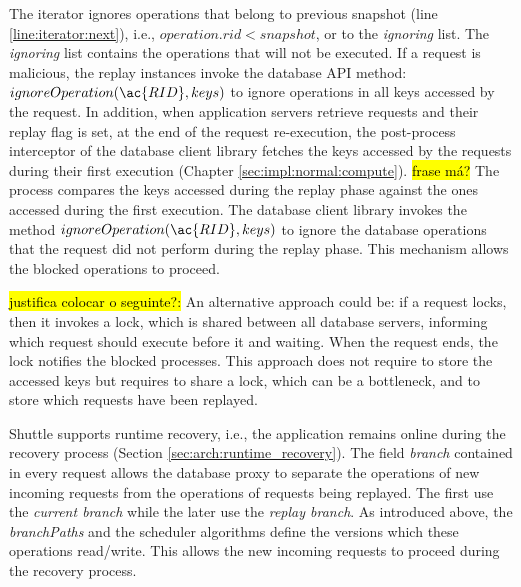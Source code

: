 The iterator ignores operations that belong to previous snapshot (line \ref{line:iterator:next}), i.e., $operation.rid < snapshot$, or to the \emph{ignoring} list. The \emph{ignoring} list contains the operations that will not be executed. If a request is malicious, the replay instances invoke the database \ac{API} method: $ignoreOperation(\ac{RID},keys)$ to ignore operations in all keys accessed by the request. In addition, when application servers retrieve requests and their replay flag is set, at the end of the request re-execution, the post-process interceptor of the database client library fetches the keys accessed by the requests during their first execution (Chapter \ref{sec:impl:normal:compute}). \hl{frase má?} The process compares the keys accessed during the replay phase against the ones accessed during the first execution. The database client library invokes the method $ignoreOperation(\ac{RID},keys)$ to ignore the database operations that the request did not perform during the replay phase. This mechanism allows the blocked operations to proceed.

\hl{justifica colocar o seguinte?:} An alternative approach could be: if a request locks, then it invokes a lock, which is shared between all database servers, informing which request should execute before it and waiting. When the request ends, the lock notifies the blocked processes. This approach does not require to store the accessed keys but requires to share a lock, which can be a bottleneck, and to store which requests have been replayed. 


Shuttle supports runtime recovery, i.e., the application remains online during the recovery process (Section \ref{sec:arch:runtime_recovery}). The field \emph{branch} contained in every request allows the database proxy to separate the operations of new incoming requests from the operations of requests being replayed. The first use the \emph{current branch} while the later use the \emph{replay branch}. As introduced above, the \emph{branchPaths} and the scheduler algorithms define the versions which these operations read/write. This allows the new incoming requests to proceed during the recovery process.

